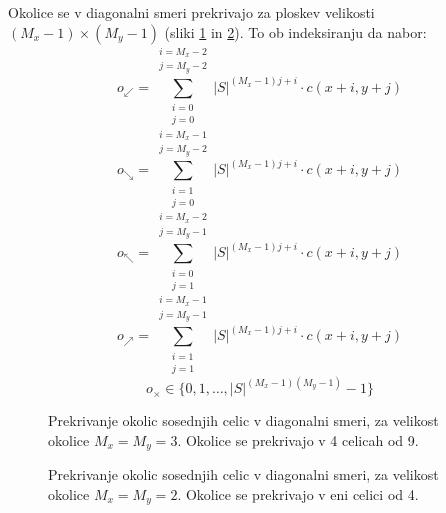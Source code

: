 \documentclass[12pt,a4paper,openany,twoside]{book}
\begin{document}
\vspace{5mm}
Okolice se v diagonalni smeri prekrivajo za ploskev velikosti \((M_x-1) \times (M_y-1)\) (sliki \ref{overlap_diagonal_moore} in \ref{overlap_diagonal_quad}).
To ob indeksiranju da nabor:
\begin{equation}
o_{\swarrow} = \sum_{\substack{i=0 \\ j=0}}^{\substack{i=M_x-2 \\ j=M_y-2}} |S|^{(M_x-1) j + i} \cdot c(x+i,y+j)
\end{equation}
\begin{equation}
o_{\searrow} = \sum_{\substack{i=1 \\ j=0}}^{\substack{i=M_x-1 \\ j=M_y-2}} |S|^{(M_x-1) j + i} \cdot c(x+i,y+j)
\end{equation}
\begin{equation}
o_{\nwarrow} = \sum_{\substack{i=0 \\ j=1}}^{\substack{i=M_x-2 \\ j=M_y-1}} |S|^{(M_x-1) j + i} \cdot c(x+i,y+j)
\end{equation}
\begin{equation}
o_{\nearrow} = \sum_{\substack{i=1 \\ j=1}}^{\substack{i=M_x-1 \\ j=M_y-1}} |S|^{(M_x-1) j + i} \cdot c(x+i,y+j)
\end{equation}
\begin{equation}
o_{\times} \in \{0, 1, \ldots, |S|^{(M_x-1)(M_y-1)}-1\}
\end{equation}

\vspace{5mm}
\begin{figure}[htb]
\centerline{}
\caption[Prekrivanje okolic \(3 \times 3\) - diagonalno.]
{Prekrivanje okolic sosednjih celic v diagonalni smeri, za velikost okolice \(M_x=M_y=3\).
Okolice se prekrivajo v 4 celicah od 9.}
\label{overlap_diagonal_moore}
\end{figure}

\vspace{5mm}
\begin{figure}[htb]
\centerline{}
\caption[Prekrivanje okolic \(2 \times 2\) - diagonalno.]
{Prekrivanje okolic sosednjih celic v diagonalni smeri, za velikost okolice \(M_x=M_y=2\).
Okolice se prekrivajo v eni celici od 4.}
\label{overlap_diagonal_quad}
\end{figure}
\end{document}
